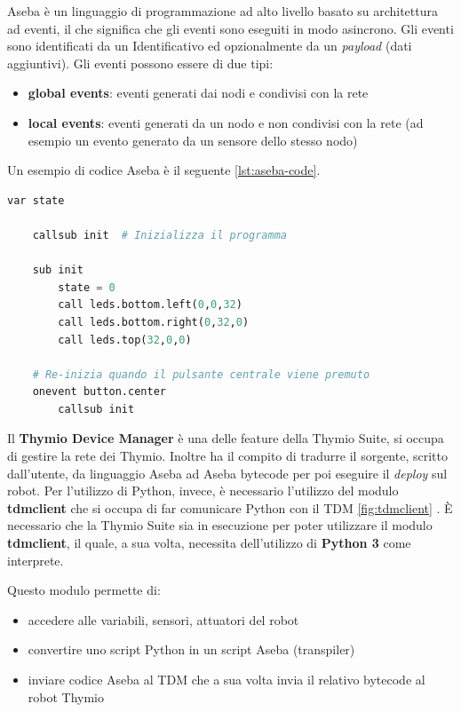 \documentclass[12pt,a4paper,openright,twoside]{book}
\begin{document}
Aseba è un linguaggio di programmazione ad alto livello basato su architettura ad eventi, il che significa che gli eventi sono eseguiti in modo asincrono. Gli eventi sono identificati da un Identificativo ed opzionalmente da un \textit{payload} (dati aggiuntivi). 
Gli eventi possono essere di due tipi:
\begin{itemize}
    \item \textbf{global events}: eventi generati dai nodi e condivisi con la rete
    \item \textbf{local events}: eventi generati da un nodo e non condivisi con la rete (ad esempio un evento generato da un sensore dello stesso nodo)
\end{itemize}

Un esempio di codice Aseba è il seguente \cref{lst:aseba-code}.
\begin{lstlisting}[language=Python, label={lst:aseba-code}, caption={Esempio di codice Aseba con eventi}]
    var state

    callsub init  # Inizializza il programma

    sub init
        state = 0
        call leds.bottom.left(0,0,32)
        call leds.bottom.right(0,32,0)
        call leds.top(32,0,0)

    # Re-inizia quando il pulsante centrale viene premuto
    onevent button.center
        callsub init
\end{lstlisting}

Il \textbf{Thymio Device Manager} è una delle feature della Thymio Suite, si occupa di gestire la rete dei Thymio. Inoltre ha il compito di tradurre il sorgente, scritto dall'utente, da linguaggio Aseba ad Aseba bytecode per poi eseguire il \textit{deploy} sul robot. Per l'utilizzo di Python, invece, è necessario l'utilizzo del modulo \textbf{tdmclient} che si occupa di far comunicare Python con il \ac{TDM} \cref{fig:tdmclient} \cite{pypiTdmclient}. È necessario che la Thymio Suite sia in esecuzione per poter utilizzare il modulo \textbf{tdmclient}, il quale, a sua volta, necessita dell'utilizzo di \textbf{Python 3} come interprete.

Questo modulo permette di:
\begin{itemize}
    \item accedere alle variabili, sensori, attuatori del robot
    \item convertire uno script Python in un script Aseba (transpiler)
    \item inviare codice Aseba al \ac{TDM} che a sua volta invia il relativo bytecode al  robot Thymio 
\end{itemize}
\end{document}
